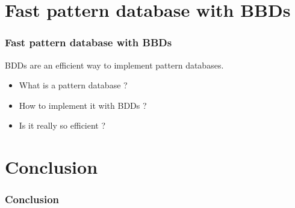 \documentclass[10pt,a4paper]{beamer}
\begin{document}
\section{Fast pattern database with BBDs}
\begin{frame}
\frametitle{Fast pattern database with BBDs}

BDDs are an efficient way to implement pattern databases.
\begin{itemize}
\item What is a pattern database ?
\item How to implement it with BDDs ?
\item Is it really so efficient ?
\end{itemize}
\end{frame}

\section{Conclusion}
\begin{frame}
\frametitle{Conclusion}

\end{frame}
\end{document}
